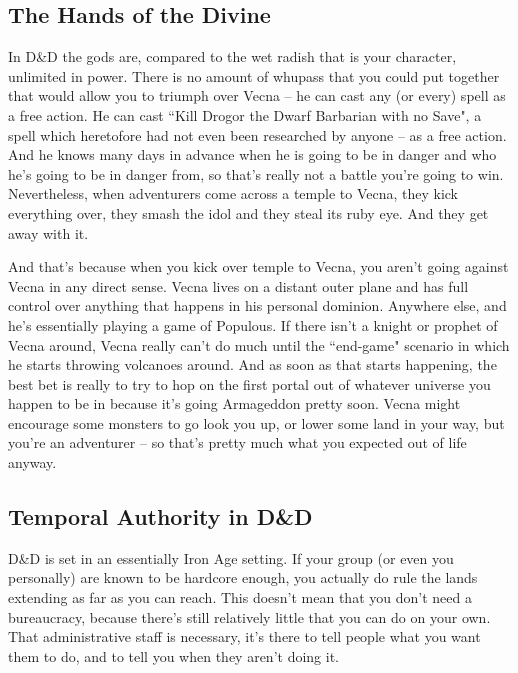 \subsection{The Hands of the Divine}

In D\&D the gods are, compared to the wet radish that is your character, unlimited in power. There is no amount of whupass that you could put together that would allow you to triumph over Vecna -- he can cast any (or every) spell as a free action. He can cast ``Kill Drogor the Dwarf Barbarian with no Save", a spell which heretofore had not even been researched by anyone -- as a free action. And he knows many days in advance when he is going to be in danger and who he's going to be in danger from, so that's really not a battle you're going to win. Nevertheless, when adventurers come across a temple to Vecna, they kick everything over, they smash the idol and they steal its ruby eye. And they get away with it.

And that's because when you kick over temple to Vecna, you aren't going against Vecna in any direct sense. Vecna lives on a distant outer plane and has full control over anything that happens in his personal dominion. Anywhere else, and he's essentially playing a game of Populous. If there isn't a knight or prophet of Vecna around, Vecna really can't do much until the ``end-game" scenario in which he starts throwing volcanoes around. And as soon as that starts happening, the best bet is really to try to hop on the first portal out of whatever universe you happen to be in because it's going Armageddon pretty soon. Vecna might encourage some monsters to go look you up, or lower some land in your way, but you're an adventurer -- so that's pretty much what you expected out of life anyway.

\subsection{Temporal Authority in D\&D}
\vspace*{-8pt}

D\&D is set in an essentially Iron Age setting. If your group (or even you personally) are known to be hardcore enough, you actually do rule the lands extending as far as you can reach. This doesn't mean that you don't need a bureaucracy, because there's still relatively little that you can do on your own. That administrative staff is necessary, it's there to tell people what you want them to do, and to tell you when they aren't doing it.

